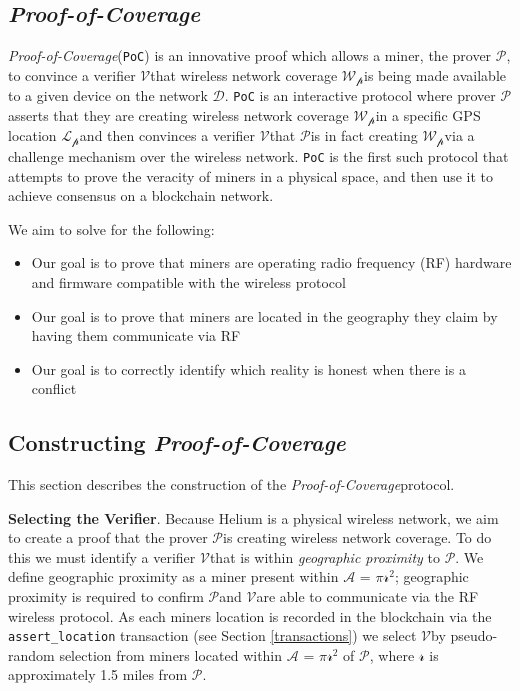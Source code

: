 \documentclass[letterpaper,11pt]{article}
\newcommand{\prover}{$\mathcal{P}$}
\newcommand{\verifier}{$\mathcal{V}$}
\newcommand{\coverage}{$\mathcal{W_p}$}
\newcommand{\device}{$\mathcal{D}$}
\newcommand{\location}{$\mathcal{L_p}$}
\newcommand{\proofofcoverage}{\textit{Proof-of-Coverage}}
\begin{document}
\subsection{\proofofcoverage}

\proofofcoverage (\verb|PoC|) is an innovative proof which allows a miner, the prover \prover, to convince a verifier \verifier that wireless network coverage \coverage is being made available to a given device on the network \device. \verb|PoC| is an interactive protocol where prover \prover asserts that they are creating wireless network coverage \coverage in a specific GPS location \location and then convinces a verifier \verifier that \prover is in fact creating \coverage via a challenge mechanism over the wireless network. \verb|PoC| is the first such protocol that attempts to prove the veracity of miners in a physical space, and then use it to achieve consensus on a blockchain network.\newline

We aim to solve for the following:

\begin{itemize}
	\item Our goal is to prove that miners are operating radio frequency (RF) hardware and firmware compatible with the wireless protocol	
	\item Our goal is to prove that miners are located in the geography they claim by having them communicate via RF
	\item Our goal is to correctly identify which reality is honest when there is a conflict
\end{itemize}

\subsection{Constructing \proofofcoverage}

This section describes the construction of the \proofofcoverage protocol.\newline

\textbf{Selecting the Verifier}. Because Helium is a physical wireless network, we aim to create a proof that the prover \prover is creating wireless network coverage. To do this we must identify a verifier \verifier that is within \textit{geographic proximity} to \prover. We define geographic proximity as a miner present within $\mathcal{A}$ = $\mathcal{\pi}$$\mathcal{r^2}$; geographic proximity is required to confirm \prover and \verifier are able to communicate via the RF wireless protocol. As each miners location is recorded in the blockchain via the \verb|assert_location| transaction (see Section \ref{transactions}) we select \verifier by pseudo-random selection from miners located within $\mathcal{A}$ = $\mathcal{\pi}$$\mathcal{r^2}$ of \prover, where $\mathcal{r}$ is approximately 1.5 miles from \prover.\newline
\end{document}
